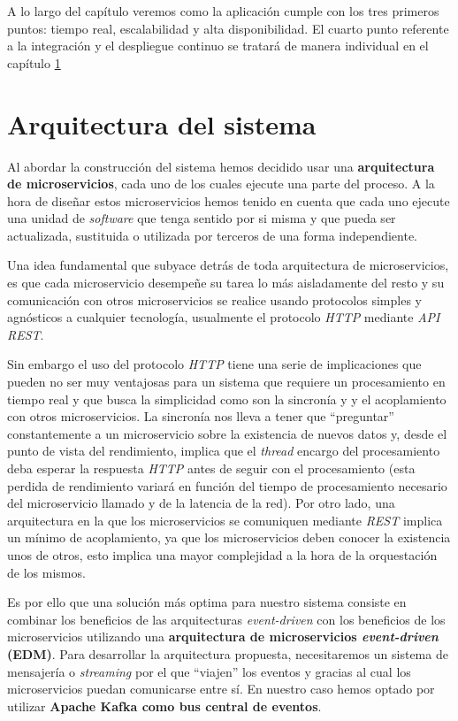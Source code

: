 A lo largo del capítulo veremos como la aplicación cumple con los tres primeros puntos: tiempo real, escalabilidad y alta disponibilidad. El cuarto punto referente a la integración y el despliegue continuo se tratará de manera individual en el capítulo \ref{}

\section{Arquitectura del sistema}


Al abordar la construcción del sistema hemos decidido usar una \textbf{arquitectura de microservicios}, cada uno de los cuales ejecute una parte del proceso. A la hora de diseñar estos microservicios hemos tenido en cuenta que cada uno ejecute una unidad de \textit{software} que tenga sentido por si misma y que pueda ser actualizada, sustituida o utilizada por terceros de una forma independiente. 

Una idea fundamental que subyace detrás de toda arquitectura de microservicios, es que cada microservicio desempeñe su tarea lo más aisladamente del resto y su comunicación con otros microservicios se realice usando protocolos simples y agnósticos a cualquier tecnología, usualmente el protocolo \textit{HTTP} mediante \textit{API REST}. 

Sin embargo el uso del protocolo \textit{HTTP} tiene una serie de implicaciones que pueden no ser muy ventajosas para un sistema que requiere un procesamiento en tiempo real y que busca la simplicidad como son la sincronía y y el acoplamiento con otros microservicios. La sincronía nos lleva a tener que ``preguntar'' constantemente a un microservicio sobre la existencia de nuevos datos y, desde el punto de vista del rendimiento, implica que el \textit{thread} encargo del procesamiento deba esperar la respuesta \textit{HTTP} antes de seguir con el procesamiento (esta perdida de rendimiento variará en función del tiempo de procesamiento necesario del microservicio llamado y de la latencia de la red).  Por otro lado, una arquitectura en la que los microservicios se comuniquen mediante \textit{REST} implica un mínimo de acoplamiento, ya que los microservicios deben conocer la existencia unos de otros, esto implica una mayor complejidad a la hora de la orquestación de los mismos. 


Es por ello que una solución más optima para nuestro sistema consiste en combinar los beneficios de las arquitecturas \textit{event-driven} con los beneficios de los microservicios utilizando una \textbf{arquitectura de microservicios  \textit{event-driven} (EDM)}. Para desarrollar la arquitectura propuesta, necesitaremos un sistema de mensajería o \textit{streaming} por el que ``viajen'' los eventos y gracias al cual los microservicios puedan comunicarse entre sí. En nuestro caso hemos optado por utilizar \textbf{Apache Kafka como bus central de eventos}. 

